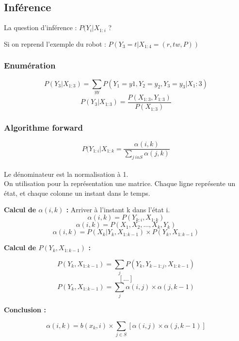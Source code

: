 \documentclass{article}
\begin{document}
\subsection{Inférence}

La question d'inférence : $ P(Y_i | X_{1:i}$ ?

Si on reprend l'exemple du robot : $P(Y_3 = t | X_{1:4} = (r, tw, P))$

\subsubsection{Enumération}

$$ P(Y_3 | X_{1:3}) = \sum_{y y} P(Y_1 = y1, Y_2 = y_2, Y_3 = y_3 | X_1:3) $$
$$ P(Y_3 | X_{1:3}) = \frac{P(X_{1:3}, Y_{1:3})}{P(X_{1:3})} $$

\subsubsection{Algorithme forward}

$$ P(Y_{1:i} | X_{1:k} = \frac{\alpha(i, k)}{\sum_{j \ in S} \alpha(j, k)} $$
\\
Le dénominateur est la normalisation à 1.
\\
On utilisation pour la représentation une matrice. Chaque ligne représente un état, et chaque colonne un instant dans le temps.

\textbf{Calcul de $\alpha(i, k)$ :} Arriver à l'instant k dans l'état i.
$$ \alpha(i, k) = P(Y_{k:i}, X_{1:k}) $$
$$ \alpha(i, k) = P(X_1, X_2, ..., X_k, Y_k) $$
$$ \alpha(i, k) = P(X_k | Y_k, X_{1:k-1}) \times P(Y_k, X_{1:k-1})$$

\textbf{Calcul de $P(Y_k, X_{1:k-1})$ :}

$$ P(Y_k, X_{1:k-1}) = \sum_j P(Y_k, Y_{k-1:j}, X_{1:k-1}) $$
$$ [...] $$
$$ P(Y_k, X_{1:k-1}) = \sum_j \alpha(i ,j) \times \alpha(j, k-1) $$

\textbf{Conclusion :}

$$ \alpha(i, k) = b(x_k, i) \times \sum_{j \in S} [\alpha(i, j) \times \alpha(j, k-1)] $$

\end{document}
